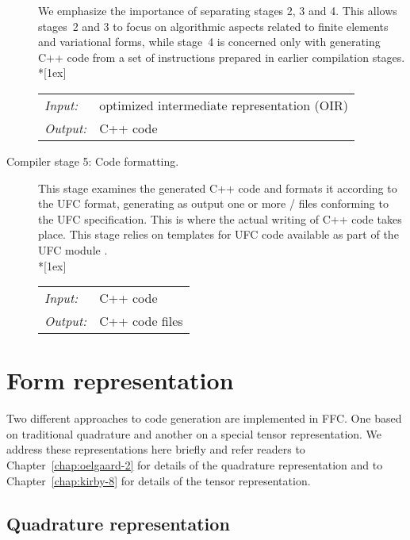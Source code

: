 \begin{description}
 We emphasize the importance of separating stages 2, 3 and 4. This
  allows stages~2 and 3 to focus on algorithmic aspects related to finite
  elements and variational forms, while stage~4 is concerned only with
  generating C++ code from a set of instructions prepared in earlier
  compilation stages. \\*[1ex]
  \begin{tabular}{ll}
    \emph{Input:}  & optimized intermediate representation (OIR) \\
    \emph{Output:} & C++ code
  \end{tabular}
\item[Compiler stage 5: Code formatting.]
  This stage examines the generated C++ code and formats it according to
  the UFC format, generating as output one or more / files
  conforming to the UFC specification. This is where the actual writing of C++
  code takes place. This stage relies on templates for UFC code
  available as part of the UFC module . \\*[1ex]
  \begin{tabular}{ll}
    \emph{Input:}  & C++ code \\
    \emph{Output:} & C++ code files
  \end{tabular}
\end{description}

\section{Form representation}
\label{sec:logg-1:representation}

Two different approaches to code generation are implemented in
FFC. One based on traditional quadrature and another on a special
tensor representation. We address these representations here briefly
and refer readers to Chapter~\ref{chap:oelgaard-2} for details of the quadrature
representation and to Chapter~\ref{chap:kirby-8} for details of the tensor
representation.

\subsection{Quadrature representation}

